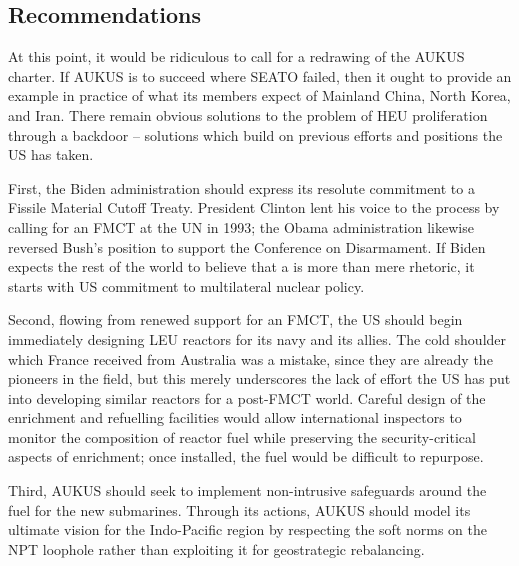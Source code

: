 \documentclass[letterpaper,12pt,twoside]{article} %
\begin{document}
\begin{multicols}{2}
\vfill
\pagebreak
\section{Recommendations}

At this point, it would be ridiculous to call for a redrawing of the AUKUS charter. If AUKUS is to succeed where SEATO failed, then it ought to provide an example in practice of what its members expect of Mainland China, North Korea, and Iran. There remain obvious solutions to the problem of HEU proliferation through a backdoor -- solutions which build on previous efforts and positions the US has taken.

First, the Biden administration should express its resolute commitment to a Fissile Material Cutoff Treaty. President Clinton lent his voice to the process by calling for an FMCT at the UN in 1993; the Obama administration likewise reversed Bush's position to support the Conference on Disarmament. If Biden expects the rest of the world to believe that a  is more than mere rhetoric, it starts with US commitment to multilateral nuclear policy.

Second, flowing from renewed support for an FMCT, the US should begin immediately designing LEU reactors for its navy and its allies. The cold shoulder which France received from Australia was a mistake, since they are already the pioneers in the field, but this merely underscores the lack of effort the US has put into developing similar reactors for a post-FMCT world. Careful design of the enrichment and refuelling facilities would allow international inspectors to monitor the composition of reactor fuel while preserving the security-critical aspects of enrichment; once installed, the fuel would be difficult to repurpose.

Third, AUKUS should seek to implement non-intrusive safeguards around the fuel for the new submarines. Through its actions, AUKUS should model its ultimate vision for the Indo-Pacific region by respecting the soft norms on the NPT loophole rather than exploiting it for geostrategic rebalancing.

\end{multicols}
  \vfill
  \pagebreak

\nocite{philippe2014safeguarding}
\nocite{costa2017brazil}
\nocite{stewart2021bulletin}

\printbibliography[heading=bibintoc,title=Bibliography]


\end{document}
